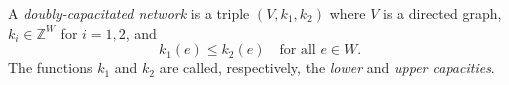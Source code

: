 A \textit{doubly-capacitated network} is a triple $(V, k_1, k_2)$ where $V$ is a directed graph, $k_i \in \mathbb{Z}^W$ for $i = 1, 2$, and
$$k_1(e) \leq k_2(e) \quad \text{for all } e \in W.$$
The functions $k_1$ and $k_2$ are called, respectively, the \textit{lower} and \textit{upper capacities}.
